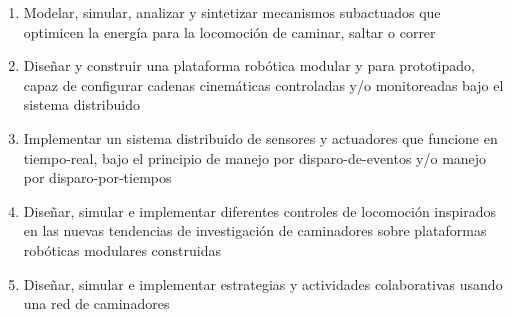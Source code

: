 {\begin{frame}[plain,t,label=exp_capas]
{{\begin{center}
        \end{center}
      }
      \vspace{-0.2cm}\hspace{-1.0cm}
      \parbox[c]{12cm}{
        \begin{enumerate}[\textbf{OE:} 1.]\scriptsize
        \item Modelar, simular, analizar y sintetizar mecanismos subactuados que optimicen la energ\'ia para la locomoci\'on de caminar, saltar o correr
        \item Dise\~nar y construir una plataforma rob\'otica modular y para prototipado, capaz de configurar cadenas cinem\'aticas  controladas y/o monitoreadas bajo el sistema distribuido
        \item Implementar un sistema distribuido de sensores y actuadores que funcione en tiempo-real, bajo el principio de manejo por disparo-de-eventos y/o manejo por disparo-por-tiempos
        \item Dise\~nar, simular e implementar diferentes controles de locomoci\'on inspirados en las nuevas tendencias de investigaci\'on de caminadores sobre plataformas rob\'oticas modulares construidas
        \item Dise\~nar, simular e implementar estrategias y actividades colaborativas usando una red de caminadores
        \end{enumerate}
      }
    }
    \hyperlink{def_objesp}{}
  \end{frame}
}